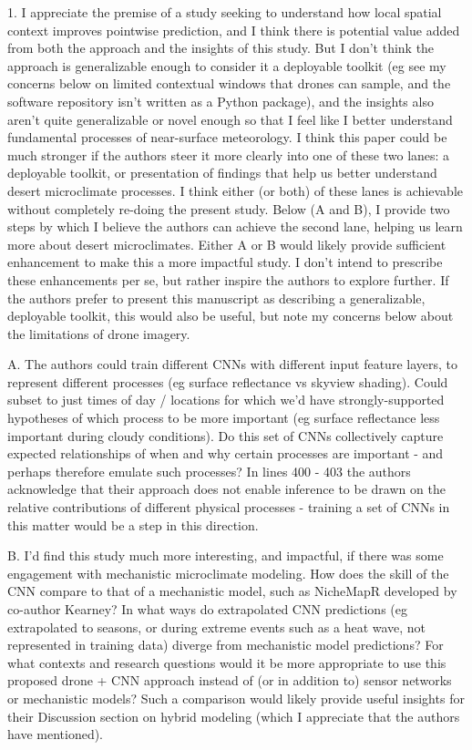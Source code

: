 \documentclass[12pt,english]{reviewresponse}
\begin{document}
\begin{revcomment}[breakable]
1. I appreciate the premise of a study seeking to understand how local spatial context improves pointwise prediction, and I think there is potential value added from both the approach and the insights of this study. But I don't think the approach is generalizable enough to consider it a deployable toolkit (eg see my concerns below on limited contextual windows that drones can sample, and the software repository isn't written as a Python package), and the insights also aren't quite generalizable or novel enough so that I feel like I better understand fundamental processes of near-surface meteorology. I think this paper could be much stronger if the authors steer it more clearly into one of these two lanes: a deployable toolkit, or presentation of findings that help us better understand desert microclimate processes. I think either (or both) of these lanes is achievable without completely re-doing the present study. Below (A and B), I provide two steps by which I believe the authors can achieve the second lane, helping us learn more about desert microclimates. Either A or B would likely provide sufficient enhancement to make this a more impactful study. I don't intend to prescribe these enhancements per se, but rather inspire the authors to explore further. If the authors prefer to present this manuscript as describing a generalizable, deployable toolkit, this would also be useful, but note my concerns below about the limitations of drone imagery.

A. The authors could train different CNNs with different input feature layers, to represent different processes (eg surface reflectance vs skyview shading). Could subset to just times of day / locations for which we'd have strongly-supported hypotheses of which process to be more important (eg surface reflectance less important during cloudy conditions). Do this set of CNNs collectively capture expected relationships of when and why certain processes are important - and perhaps therefore emulate such processes? In lines 400 - 403 the authors acknowledge that their approach does not enable inference to be drawn on the relative contributions of different physical processes - training a set of CNNs in this matter would be a step in this direction.

B. I'd find this study much more interesting, and impactful, if there was some engagement with mechanistic microclimate modeling. How does the skill of the CNN compare to that of a mechanistic model, such as NicheMapR developed by co-author Kearney? In what ways do extrapolated CNN predictions (eg extrapolated to seasons, or during extreme events such as a heat wave, not represented in training data) diverge from mechanistic model predictions? For what contexts and research questions would it be more appropriate to use this proposed drone + CNN approach instead of (or in addition to) sensor networks or mechanistic models? Such a comparison would likely provide useful insights for their Discussion section on hybrid modeling (which I appreciate that the authors have mentioned).
\end{revcomment}
\end{document}
